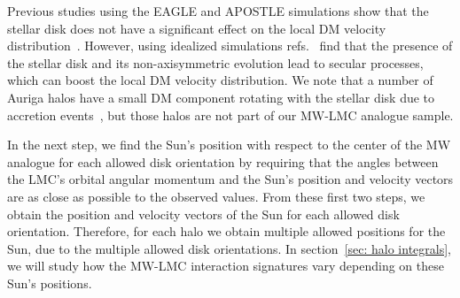 Previous studies using the EAGLE and APOSTLE simulations show that the stellar disk does not have a significant effect on the local DM velocity distribution~\cite{Bozorgnia:2016ogo, Schaller:2016uot}. However, using idealized simulations refs.~\cite{Petersen:2016vck, Donaldson:2021byu} find that the presence of the stellar disk and its non-axisymmetric evolution  lead to secular processes, which  
can boost the local DM velocity distribution. 
We note that a number of Auriga halos have a small  DM component rotating with the stellar disk due to accretion events~\cite{Gomez:2017yzr}, but those halos are not part of our MW-LMC analogue sample. 



In the next step, we find the Sun's position with respect to the center of the MW analogue for each allowed disk orientation by requiring that the angles between the LMC's orbital angular momentum and the Sun's position and velocity vectors are as close as possible to the observed values. From these first two steps, we obtain the position and velocity vectors of the Sun for each allowed disk orientation. Therefore, for each halo we obtain multiple allowed positions for the Sun, due to the multiple allowed disk orientations. In section~\ref{sec: halo integrals}, we will study how the MW-LMC interaction signatures vary depending on these  Sun’s positions.

